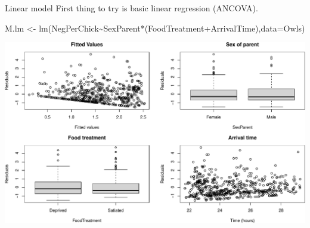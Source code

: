 \documentclass[
  ignorenonframetext,
]{beamer}
\newenvironment{Shaded}{\begin{snugshade}}{\end{snugshade}}
\newcommand{\AttributeTok}[1]{\textcolor[rgb]{0.77,0.63,0.00}{#1}}
\newcommand{\FunctionTok}[1]{\textcolor[rgb]{0.00,0.00,0.00}{#1}}
\newcommand{\NormalTok}[1]{#1}
\newcommand{\OtherTok}[1]{\textcolor[rgb]{0.56,0.35,0.01}{#1}}
\newcommand{\SpecialCharTok}[1]{\textcolor[rgb]{0.00,0.00,0.00}{#1}}
\begin{document}
\begin{frame}[fragile]{Linear model}
\protect\hypertarget{linear-model}{}
First thing to try is basic linear regression (ANCOVA).

\scriptsize

\begin{Shaded}
\begin{Highlighting}[]
\NormalTok{M.lm }\OtherTok{\textless{}{-}} \FunctionTok{lm}\NormalTok{(NegPerChick}\SpecialCharTok{\textasciitilde{}}\NormalTok{SexParent}\SpecialCharTok{*}\NormalTok{(FoodTreatment}\SpecialCharTok{+}\NormalTok{ArrivalTime),}\AttributeTok{data=}\NormalTok{Owls)}
\end{Highlighting}
\end{Shaded}

\includegraphics{mixed_models_files/figure-beamer/unnamed-chunk-9-1.pdf}
\end{frame}
\end{document}
